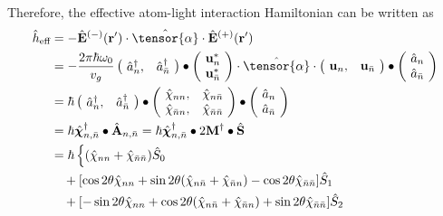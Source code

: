 \documentclass[preprint,aps,pra,onecolumn,superscriptaddress]{revtex4-1} %
\def\br{\mathbf{r}}
\newcommand{\nn}{\nonumber}
\newcommand{\eff}{\text{eff}}
\begin{document}
\begin{appendix}
Therefore, the effective atom-light interaction Hamiltonian can be written as
\begin{align}
\hat{h}_\eff &= -\hat{\mathbf{E}}^{(-)}(\br')\cdot\hat{\tensor{\mathbf{\alpha}}}\cdot\hat{\mathbf{E}}^{(+)}(\br')\nn\\
&=-\frac{2 \pi \hbar \omega_0}{ v_g}
\left(\!\begin{array}{cc}\hat{a}_n^\dagger, & \hat{a}_{\bar{n}}^\dagger\end{array} \!\right)\bullet \left(\!\begin{array}{c}\mathbf{u}_n^*\\ \mathbf{u}_{\bar{n}}^*\end{array}\!\right)
\cdot\hat{\tensor{\mathbf{\alpha}}}\cdot
\left(\!\begin{array}{cc}\mathbf{u}_n, & \mathbf{u}_{\bar{n}}\end{array}\!\right)
\bullet \left(\!\begin{array}{c}\hat{a}_n\\ \hat{a}_{\bar{n}}\end{array} \!\right) \nn\\
&= \hbar \left(\!\begin{array}{cc}\hat{a}_n^\dagger, & \hat{a}_{\bar{n}}^\dagger\end{array} \!\right)\bullet
\left(\!\begin{array}{cc} \hat{\chi}_{nn},&\hat{\chi}_{n\bar{n}}\\
\hat{\chi}_{\bar{n}n},&\hat{\chi}_{\bar{n}\bar{n}}\end{array} \!\right)
\bullet\left(\!\begin{array}{c}\hat{a}_n\\ \hat{a}_{\bar{n}}\end{array} \!\right) \nn\\
&= \hbar \hat{\boldsymbol{\chi}}_{n,\bar{n}}^\dagger\bullet \hat{\mathbf{A}}_{n,\bar{n}}= \hbar \hat{\boldsymbol{\chi}}_{n,\bar{n}}^\dagger\bullet 2\mathbf{M}^\dagger\bullet \hat{\mathbf{S}}\\
&= \hbar\left\{(\hat{\chi}_{nn}+ \hat{\chi}_{\bar{n}\bar{n}})\hat{S}_0 \right.\nn\\
&\quad+ [\cos 2\theta \hat{\chi}_{nn}+ \sin 2\theta(\hat{\chi}_{n\bar{n}}+\hat{\chi}_{\bar{n}n}) - \cos 2\theta\hat{\chi}_{\bar{n}\bar{n}}]\hat{S}_1 \nn\\
&\quad+ [-\sin 2\theta \hat{\chi}_{nn}+ \cos 2\theta(\hat{\chi}_{n\bar{n}}+\hat{\chi}_{\bar{n}n}) + \sin 2\theta \hat{\chi}_{\bar{n}\bar{n}}]\hat{S}_2 \nn\\

\end{align}
\end{appendix}
\end{document}
